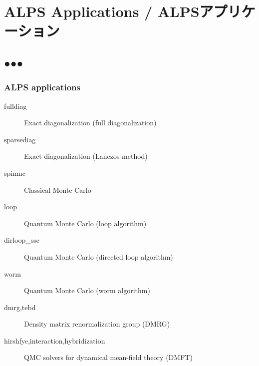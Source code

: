 \section{ALPS Applications / ALPSアプリケーション}
\subsection*{{\protect\color{red}●}{\protect\color{blue}●}{\protect\color{green}●}}

\begin{frame}[t,fragile]
  \frametitle{ALPS applications}
  \begin{description}
  \item[fulldiag] Exact diagonalization (full diagonalization)
  \item[sparsediag] Exact diagonalization (Lanczos method)
  \item[spinmc] Classical Monte Carlo
  \item[loop] Quantum Monte Carlo (loop algorithm)
  \item[dirloop\_sse] Quantum Monte Carlo (directed loop algorithm)
  \item[worm] Quantum Monte Carlo (worm algorithm)
  \item[dmrg,tebd] Density matrix renormalization group (DMRG)
  \item[hirshfye,interaction,hybridization] QMC solvers for dynamical mean-field theory (DMFT)
  \end{description}
\end{frame}

